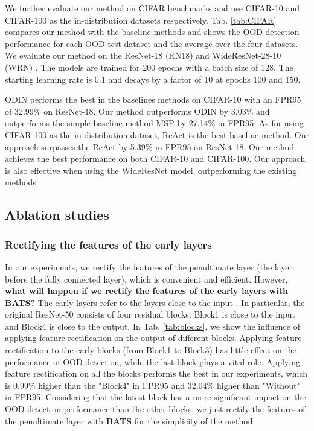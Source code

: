 \documentclass{article}
\begin{document}
We further evaluate our method on CIFAR benchmarks and use CIFAR-10 and CIFAR-100 \cite{krizhevsky2009learningCIFAR} as the in-distribution datasets respectively. Tab. \ref{tab:CIFAR} compares our method with the baseline methods and shows the OOD detection
performance for each OOD test dataset and the average over the four datasets. We evaluate our method on the ResNet-18 (RN18) \cite{he2016resnet} and WideResNet-28-10 (WRN) \cite{zagoruyko2017wideresnet}. The models are trained for 200 epochs with a batch size of 128. The {starting} learning rate is 0.1 and decays by a factor of 10 at epochs 100 and 150.

ODIN \cite{ODIN} performs the best in the baselines methods on CIFAR-10 with an FPR95 of 32.99$\%$ on ResNet-18. Our method outperforms ODIN by 3.03$\%$ and outperforms the simple baseline method MSP \cite{hendrycks17baseline} by 27.14$\%$ in FPR95. As for using CIFAR-100 as the in-distribution dataset, ReAct \cite{sun2021react} is the best baseline method. Our approach surpasses the ReAct by 5.39$\%$ in FPR95 on ResNet-18. Our method achieves the best performance on both CIFAR-10 and CIFAR-100. Our approach is also effective when using the WideResNet model, outperforming the existing methods.







\subsection{Ablation studies}
\subsubsection{Rectifying the features of the early layers} 
In our experiments, we rectify the features of the penultimate layer (the layer before the fully connected layer), which is convenient and efficient. However, \textbf{what will happen if we rectify the features of the early layers with BATS?} The early layers refer to the layers close to the input \cite{natureindividual}. In particular, the original ResNet-50 \cite{he2016resnet} consists of four residual blocks. Block1 is close to the input and Block4 is close to the output. In Tab. \ref{tab:blocks}, we show the influence of applying feature rectification on the output of different blocks. Applying feature rectification to the early blocks (from Block1 to Block3) has little effect on the performance of OOD detection, while the last block plays a vital role. Applying feature rectification on all the blocks performs the best in our experiments, which is 0.99$\%$ higher than the "Block4" in FPR95 and 32.04$\%$ higher than "Without" in FPR95. Considering that the latest block has a more significant impact on the OOD detection performance than the other blocks, we just rectify the features of the penultimate layer with \textbf{BATS} for the simplicity of the 
method. 
\end{document}
